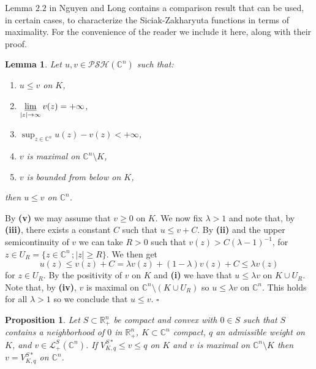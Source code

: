 \documentclass[a4paper,12pt,leqno,english]{article}
\numberwithin{equation}{section}
\newtheorem{lemma+}  [theorem+]  {Lemma}
\newtheorem{proposition+}  [theorem+]  {Proposition}
\newenvironment{lemma}{\begin{lemma+}\sl}{\end{lemma+}\rm}
\newenvironment{proposition}{\begin{proposition+}\sl}{\end{proposition+}\rm}
\newenvironment{proof}{\medbreak\noindent{\bf  Proof:}\rm}{\hfill$\square$\rm}
\begin{document}
Lemma $2.2$ in Nguyen and Long \cite{NguTan:2021} contains a comparison result that can be used, in certain cases,
    to characterize the Siciak-Zakharyuta functions in terms of maximality.
For the convenience of the reader we include it here, along with their proof.
\begin{lemma}
    \label{bg:lemma.1}
Let $u, v \in \mathcal{PSH}(\mathbb{C}^n)$ such that:
\begin{enumerate}
    \item[{\bf (i)}  ] $u \leq v$ on $K$,
    \item[{\bf (ii)} ] $\varliminf\limits_{|z| \rightarrow \infty} v(z) = +\infty$,
    \item[{\bf (iii)}] $\sup_{z \in \mathbb{C}^n} u(z) - v(z) < +\infty$,
    \item[{\bf (iv)} ] $v$ is maximal on $\mathbb{C}^n \setminus K$,
    \item[{\bf (v)}  ] $v$ is bounded from below on $K$,
\end{enumerate}
then $u \leq v$ on $\mathbb{C}^n$.
\end{lemma}
\begin{proof}
By {\bf(v)} we may assume that $v \geq 0$ on $K$.
We now fix $\lambda > 1$ and note that, by {\bf(iii)}, there exists a constant $C$ such that $u \leq v + C$.
By {\bf (ii)} and the upper semicontinuity of $v$ we can take $R > 0$ such that $v(z) > C(\lambda - 1)^{-1}$,
    for $z \in U_R = \{z \in \mathbb{C}^n \,; |z| \geq R\}$.
We then get
\begin{equation*}
    u(z)
    \leq
    v(z) + C
    =
    \lambda v(z) + (1 - \lambda) v(z) + C
    \leq
    \lambda v(z)
\end{equation*}
for $z \in U_R$. By the positivity of $v$ on $K$ and {\bf (i)} we have that $u \leq \lambda v$ on $K \cup U_R$.
Note that, by {\bf (iv)}, $v$ is maximal on $\mathbb{C}^n \setminus (K \cup U_R)$ so $u \leq \lambda v$ on $\mathbb{C}^n$.
This holds for all $\lambda > 1$ so we conclude that $u \leq v$.
\end{proof}
\begin{proposition}
\label{bg:prop.1}
Let $S \subset \mathbb{R}_+^n$ be compact and convex with $0 \in S$ such that $S$ contains a neighborhood of $0$ in $\mathbb{R}^n_+$,
    $K \subset \mathbb{C}^n$ compact,
    $q$ an admissible weight on $K$, and
    $v \in \mathcal{L}^S_+(\mathbb{C}^n)$.
    If $V^{S*}_{K, q} \leq v \leq q$ on $K$ and $v$ is maximal on $\mathbb{C}^n \setminus K$ then $v = V^{S*}_{K, q}$ on $\mathbb{C}^n$.
\end{proposition}
\end{document}
